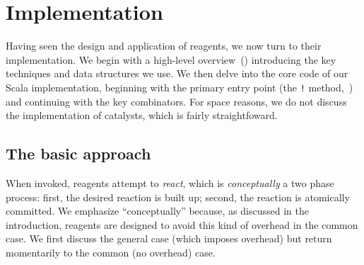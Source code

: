 \documentclass[preprint,nocopyrightspace]{sigplanconf}
\begin{document}




\section{Implementation}
\label{sec:implementation}



Having seen the design and application of reagents, we now turn to their
implementation.  We begin with a high-level overview~()
introducing the key techniques and data structures we use.  We then delve into
the core code of our Scala implementation, beginning with the primary entry
point (the \lstinline{!} method,~) and continuing with the
key combinators.  For space reasons, we do not discuss the implementation of
catalysts, which is fairly straightfoward.

\subsection{The basic approach}
\label{sec:impl-approach}

When invoked, reagents attempt to \emph{react}, which is \emph{conceptually} a
two phase process: first, the desired reaction is built up; second, the reaction
is atomically committed.  We emphasize ``conceptually'' because, as discussed in
the introduction, reagents are designed to avoid this kind of overhead in the
common case.  We first discuss the general case (which imposes overhead) but
return momentarily to the common (no overhead) case.
\end{document}
